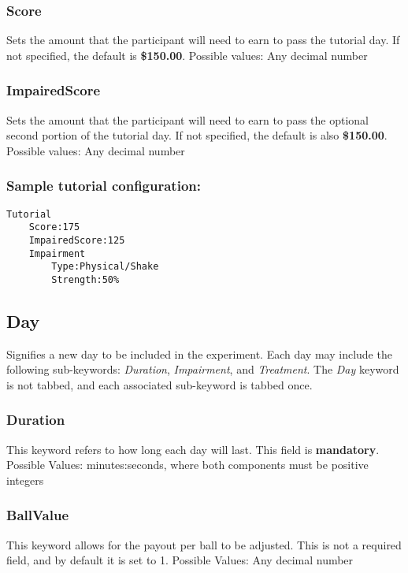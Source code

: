 \documentclass{article}
\begin{document}
\subsubsection{Score} Sets the amount that the participant will need to earn to pass the tutorial day. If not specified, the default is \textbf{\$150.00}. \newline
\indent Possible values: \newline
\indent\indent Any decimal number

\subsubsection{ImpairedScore} Sets the amount that the participant will need to earn to pass the optional second portion of the tutorial day. If not specified, the default is also \textbf{\$150.00}. \newline
\indent Possible values: \newline
\indent\indent Any decimal number

\subsubsection{Sample tutorial configuration:}
\begin{lstlisting}
Tutorial
    Score:175
    ImpairedScore:125
    Impairment
        Type:Physical/Shake
        Strength:50%
\end{lstlisting}

\subsection{Day}
Signifies a new day to be included in the experiment. Each day may include the following sub-keywords: \textit{Duration}, \textit{Impairment}, and \textit{Treatment}. The \textit{Day} keyword is not tabbed, and each associated sub-keyword is tabbed once.

\subsubsection{Duration}
This keyword refers to how long each day will last. This field is \textbf{mandatory}. \newline
\indent Possible Values: \newline
\indent\indent minutes:seconds, where both components must be positive integers

\subsubsection{BallValue}
This keyword allows for the payout per ball to be adjusted. This is not a required field, and by default it is set to 1. \newline
\indent Possible Values: \newline
\indent\indent Any decimal number
\end{document}
